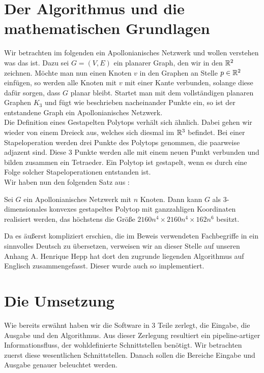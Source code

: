 \section*{Der Algorithmus und die mathematischen Grundlagen}
Wir betrachten im folgenden ein Apollonianisches Netzwerk und wollen verstehen was das ist. Dazu sei $G=(V,E)$ ein planarer Graph, den wir in den $\mathbb{R}^2$ zeichnen. Möchte man nun einen Knoten $v$ in den Graphen an Stelle $p\in\mathbb{R}^2$ einfügen, so werden alle Knoten mit $v$ mit einer Kante verbunden, solange diese dafür sorgen, dass $G$ planar bleibt. Startet man mit dem vollständigen planaren Graphen $K_3$ und fügt wie beschrieben nacheinander Punkte ein, so ist der entstandene Graph ein Apollonianisches Netzwerk.\\
Die Definition eines Gestapelten Polytops verhält sich ähnlich. Dabei gehen wir wieder von einem Dreieck aus, welches sich diesmal im $\mathbb{R}^3$ befindet. Bei einer Stapeloperation werden drei Punkte des Polytops genommen, die paarweise adjazent sind. Diese 3 Punkte werden alle mit einem neuen Punkt verbunden und bilden zusammen ein Tetraeder. Ein Polytop ist gestapelt, wenn es durch eine Folge solcher Stapeloperationen entstanden ist.\\
Wir haben nun den folgenden Satz aus \cite{stackedPoly1}:

\begin{thm}
Sei $G$ ein Apollonianisches Netzwerk mit $n$ Knoten. Dann kann $G$ als $3$-dimensionales konvexes gestapeltes Polytop mit ganzzahligen Koordinaten realisiert werden, das höchstens die Größe $2160n^4\times 2160n^4\times 162n^6$ besitzt.
\end{thm}

Da es äußerst kompliziert erschien, die im Beweis verwendeten Fachbegriffe in ein sinnvolles Deutsch zu übersetzen, verweisen wir an dieser Stelle auf unseren Anhang A. Henrique Hepp hat dort den zugrunde liegenden Algorithmus auf Englisch zusammengefasst. Dieser wurde auch so implementiert.

\section*{Die Umsetzung}
Wie bereits erwähnt haben wir die Software in 3 Teile zerlegt, die Eingabe, die Ausgabe und den Algorithmus. Aus dieser Zerlegung resultiert ein pipeline-artiger Informationsfluss, der wohldefinierte Schnittstellen benötigt. Wir betrachten zuerst diese wesentlichen Schnittstellen. Danach sollen die Bereiche Eingabe und Ausgabe genauer beleuchtet werden. 

